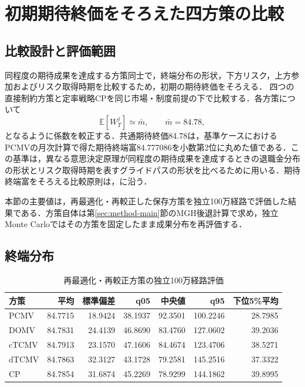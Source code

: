 \documentclass[10pt,a4paper]{article}
\theoremstyle{plain}
\theoremstyle{definition}
\newcommand{\E}{\mathbb{E}}
\begin{document}
\section{初期期待終価をそろえた四方策の比較}\label{sec:numerical-results}
\label{sec:all-strategy-numerics}

\subsection{比較設計と評価範囲}
同程度の期待成果を達成する方策同士で，終端分布の形状，下方リスク，上方参加およびリスク取得時期を比較するため，初期の期待終価をそろえる．
四つの直接制約方策と定率戦略CPを同じ市場・制度前提の下で比較する．各方策について
\begin{equation}
  \E[W_T^j]\simeq\bar m,\qquad \bar m=84.78,
  \label{eq:equal-mean-calibration}
\end{equation}
となるように係数を較正する．共通期待終価84.78は，基準ケースにおけるPCMVの月次計算で得た期待終端富84.777086を小数第2位に丸めた値である．この基準は，異なる意思決定原理が同程度の期待成果を達成するときの退職金分布の形状とリスク取得時期を表すグライドパスの形状を比べるために用いる．期待終端富をそろえる比較原則は，\citet{vanStadenDangForsyth2021}に沿う．

本節の主要値は，再最適化・再較正した保存方策を独立100万経路で評価した結果である．方策自体は第\ref{sec:method-main}節のMGH後退計算で求め，独立Monte Carloではその方策を固定したまま成果分布を再評価する．

\subsection{終端分布}
\label{sec:monthly-baseline-results}

\begin{table}[htbp]
\centering\small
\caption{再最適化・再較正方策の独立100万経路評価}
\label{tab:all-strategy-results}
\begin{tabular}{lrrrrrr}
\toprule
方策 & 平均 & 標準偏差 & q05 & 中央値 & q95 & 下位5\%平均 \\
\midrule
PCMV  & 84.7715 & 18.9424 & 38.1937 & 92.3501 & 100.2246 & 28.7985 \\
DOMV  & 84.7831 & 24.4139 & 46.8690 & 83.4760 & 127.0602 & 39.2036 \\
cTCMV & 84.7913 & 23.1570 & 47.1606 & 84.4674 & 123.4706 & 38.5271 \\
dTCMV & 84.7863 & 32.3127 & 43.1728 & 79.2581 & 145.2516 & 37.3322 \\
CP    & 84.7854 & 31.6874 & 45.2269 & 78.9299 & 144.1862 & 39.8995 \\
\bottomrule
\end{tabular}
\end{table}
\end{document}
